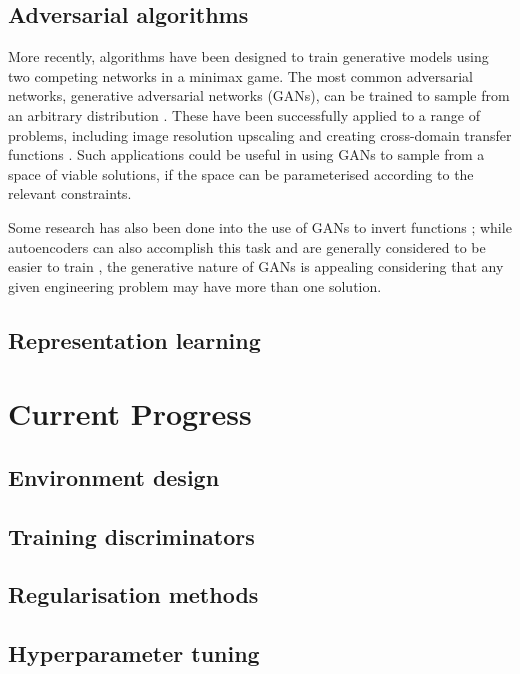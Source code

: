 \documentclass[a4paper]{article}
\begin{document}
\subsection{Adversarial algorithms}

More recently, algorithms have been designed to train generative models using two competing networks in a minimax game.
The most common adversarial networks, generative adversarial networks (GANs), can be trained to sample from an arbitrary distribution \cite{goodfellow14, horger18}.
These have been successfully applied to a range of problems, including image resolution upscaling \cite{ledig17} and creating cross-domain transfer functions \cite{zhu18}.
Such applications could be useful in using GANs to sample from a space of viable solutions, if the space can be parameterised according to the relevant constraints.

Some research has also been done into the use of GANs to invert functions \cite{anirudh18};
while autoencoders can also accomplish this task and are generally considered to be easier to train \cite{bang18},
the generative nature of GANs is appealing considering that any given engineering problem may have more than one solution.

\subsection{Representation learning}

\section{Current Progress}

\subsection{Environment design}

\subsection{Training discriminators}

\subsection{Regularisation methods}

\subsection{Hyperparameter tuning}
\end{document}

